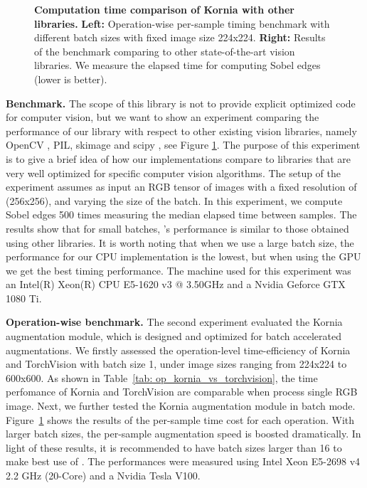 \begin{figure}
\begin{minipage}{.5\textwidth}
\end{minipage}
\caption[Computation time comparison of Kornia with other libraries]{{\bf Computation time comparison of Kornia with other libraries. }\textbf{Left:} Operation-wise per-sample timing benchmark with different batch sizes with fixed image size 224x224.%
\textbf{Right:} Results of the benchmark comparing \lib{} to other state-of-the-art vision libraries. We measure the elapsed time for computing Sobel edges (lower is better).}
\label{fig:op_benchmark}
\end{figure}

\textbf{Benchmark.} The scope of this library is not to provide explicit optimized code for computer vision, but we want to show an experiment comparing the performance of our library with respect to other existing vision libraries, namely OpenCV \citep{opencv}, PIL, skimage \citep{scikit-image} and scipy \citep{scikit-learn}, see Figure \ref{fig:op_benchmark}. The purpose of this experiment is to give a brief idea of how our implementations compare to libraries that are very well optimized for specific computer vision algorithms. The setup of the experiment assumes as input an RGB tensor of images with a fixed resolution of (256x256), and varying the size of the batch. In this experiment, we compute Sobel edges 500 times measuring the median elapsed time between samples. The results show that for small batches, \lib's performance is similar to those obtained using  other libraries. It is worth noting that when we use a large batch size, the performance for our CPU implementation is the lowest, but when using the GPU we get the best timing performance. The machine used for this experiment was an Intel(R) Xeon(R) CPU E5-1620 v3 @ 3.50GHz and a Nvidia Geforce GTX 1080 Ti.

\textbf{Operation-wise benchmark.} The second experiment evaluated the  Kornia augmentation module, which is designed and optimized for batch accelerated augmentations. We firstly assessed the operation-level time-efficiency of Kornia and TorchVision with batch size 1, under   image sizes ranging from 224x224 to 600x600. As shown in Table~\ref{tab: op_kornia_vs_torchvision}, the time perfomance of Kornia and TorchVision are comparable when process single RGB image. Next, we further tested the Kornia augmentation module in batch mode. Figure~\ref{fig:op_benchmark} shows the results of the per-sample time cost for each operation. With  larger batch sizes, the per-sample augmentation speed is boosted dramatically. In light of these  results, it is recommended to have batch sizes larger than 16 to make best use of \lib{}. The performances were measured using Intel Xeon E5-2698 v4 2.2 GHz (20-Core) and a Nvidia Tesla V100.

